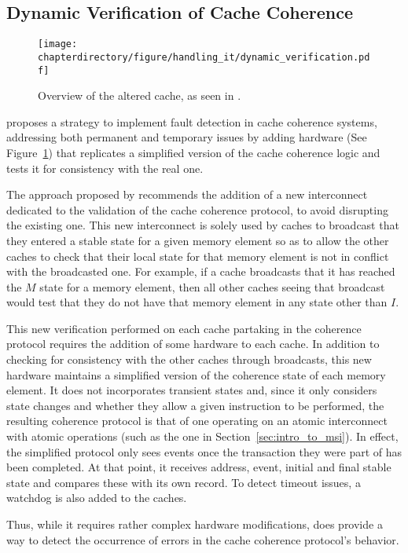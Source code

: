 \stopallthesefloats{}

\subsection{Dynamic Verification of Cache Coherence}
\begin{figure}
\begin{center}
\texttt{[image: \\chapterdirectory/figure/handling\_it/dynamic\_verification.pdf]}
\end{center}
\caption{Overview of the altered cache, as seen in \cite{Cantin2004DynamicVO}.}%
\label{fig:handling_it:dynamic_verification}
\end{figure}

\cite{Cantin2004DynamicVO} proposes a strategy to implement fault detection in
cache coherence systems, addressing both permanent and temporary issues by
adding hardware (See Figure~\ref{fig:handling_it:dynamic_verification}) that
replicates a simplified version of the cache coherence logic and tests it for
consistency with the real one.

The approach proposed by \cite{Cantin2004DynamicVO} recommends the addition
of a new interconnect dedicated to the validation of the cache coherence
protocol, to avoid disrupting the existing one. This new interconnect is solely
used by caches to broadcast that they entered a stable state for a given memory
element so as to allow the other caches to check that their local state for that
memory element is not in conflict with the broadcasted one. For example, if a
cache broadcasts that it has reached the $M$ state for a memory element, then
all other caches seeing that broadcast would test that they do not have that
memory element in any state other than $I$.

This new verification performed on each cache partaking in the coherence
protocol requires the addition of some hardware to each cache. In addition to
checking for consistency with the other caches through broadcasts, this new
hardware maintains a simplified version of the coherence state of each memory
element. It does not incorporates transient states and, since it only considers
state changes and whether they allow a given instruction to be performed, the
resulting coherence protocol is that of one operating on an atomic interconnect
with atomic operations (such as the one in Section~\ref{sec:intro_to_msi}).
In effect, the simplified protocol only sees events once the transaction they
were part of has been completed. At that point, it receives address, event,
initial and final stable state and compares these with its own record. To detect
timeout issues, a watchdog is also added to the caches.

Thus, while it requires rather complex hardware modifications,
\cite{Cantin2004DynamicVO} does provide a way to detect the occurrence of errors
in the cache coherence protocol's behavior.

\stopallthesefloats{}
